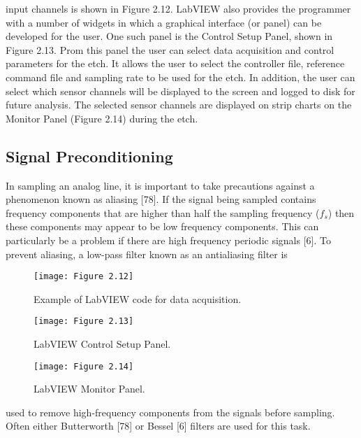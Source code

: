 
\noindent input channels is shown in Figure 2.12. LabVIEW also provides the programmer with a number of widgets in which a graphical interface (or panel) can be developed for the user. One such panel is the Control Setup Panel, shown in Figure 2.13. Prom this panel the user can select data acquisition and control parameters for the etch. It allows the user to select the controller file, reference command file and sampling rate to be used for the etch. In addition, the user can select which sensor channels will be displayed to the screen and logged to disk for future analysis. The selected sensor channels are displayed on strip charts on the Monitor Panel (Figure 2.14) during the etch.


\subsection{Signal Preconditioning}

In sampling an analog line, it is important to take precautions against a phenomenon known as aliasing [78]. If the signal being sampled contains frequency components that are higher than half the sampling frequency ($f_{s}$) then these components may appear to be low frequency components. This can particularly be a problem if there are high frequency periodic signals [6]. To prevent aliasing, a low-pass filter known as an antialiasing filter is

\begin{figure}[H]
	\centering
	\texttt{[image: Figure 2.12]}
	\bf\caption{  Example of LabVIEW code for data acquisition.}
	\label{fig:2.12}
\end{figure}

\begin{figure}[H]
	\centering
	\texttt{[image: Figure 2.13]}
	\bf\caption{  LabVIEW Control Setup Panel.}
	\label{fig:2.13}
\end{figure}

\vspace*{3cm}
\begin{figure}[H]
	\centering
	\texttt{[image: Figure 2.14]}
	\bf\caption{  LabVIEW Monitor Panel.}
	\label{fig:2.14}
\end{figure}

\newpage

\noindent used to remove high-frequency components from the signals before sampling. Often either Butterworth [78] or Bessel [6] filters are used for this task.

